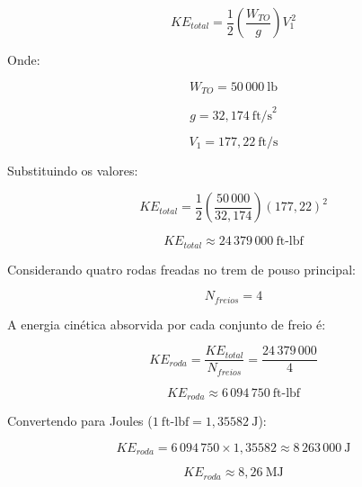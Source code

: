 \begin{equation}
    KE_{total} =
    \frac{1}{2}
    \left(
        \frac{W_{TO}}{g}
    \right)
    V_1^{\,2}
\end{equation}

Onde:

\begin{equation}
    W_{TO} = 50\,000 \ \text{lb}
\end{equation}

\begin{equation}
    g = 32{,}174 \ \text{ft/s}^2
\end{equation}

\begin{equation}
    V_1 = 177{,}22 \ \text{ft/s}
\end{equation}

Substituindo os valores:

\begin{equation}
    KE_{total} =
    \frac{1}{2}
    \left(
        \frac{50\,000}{32{,}174}
    \right)
    (177{,}22)^2
\end{equation}

\begin{equation}
    KE_{total}
    \approx
    24\,379\,000 \ \text{ft-lbf}
\end{equation}

Considerando quatro rodas freadas no trem de pouso principal:

\begin{equation}
    N_{freios} = 4
\end{equation}

A energia cinética absorvida por cada conjunto de freio é:

\begin{equation}
    KE_{roda} =
    \frac{KE_{total}}{N_{freios}}
    =
    \frac{24\,379\,000}{4}
\end{equation}

\begin{equation}
    KE_{roda}
    \approx
    6\,094\,750 \ \text{ft-lbf}
\end{equation}

Convertendo para Joules ($1\ \text{ft-lbf} = 1{,}35582\ \text{J}$):

\begin{equation}
    KE_{roda}
    = 6\,094\,750 \times 1{,}35582
    \approx 8\,263\,000 \ \text{J}
\end{equation}

\begin{equation}
    \boxed{KE_{roda} \approx 8{,}26 \ \text{MJ}}
\end{equation}

